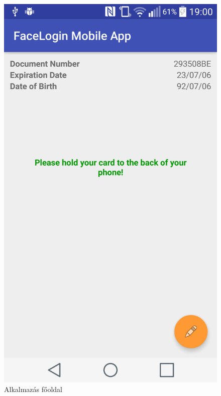 \begin{figure}[h]
 \begin{minipage}{.30\textwidth} 
\centering
    \includegraphics[scale=0.10]{img/app_main_screen}
    \caption{Alkalmazás főoldal}
 \end{minipage}
 \begin{minipage}{.30\textwidth} 
\centering

\end{minipage}
\end{figure}
